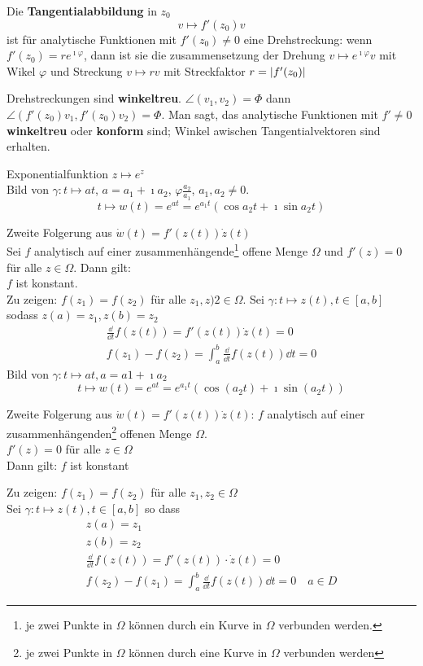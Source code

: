 Die \textbf{Tangentialabbildung} in $z_0$
\[ v \mapsto f'(z_0) v \]
ist für analytische Funktionen mit $f'(z_0) \neq 0$ eine Drehstreckung: wenn $f'(z_0) = re^{\imath\varphi}$, dann ist sie die zusammensetzung der Drehung $v \mapsto e^{\imath\varphi}v$ mit Wikel $\varphi$ und Streckung $v \mapsto rv$ mit Streckfaktor $r = \abs{f'(z_0)}$

Drehstreckungen sind \textbf{winkeltreu}.
$\angle (v_1 , v_2) = \Phi$ dann $\angle( f'(z_0) v_1 , f'(z_0)v_2 ) = \Phi$.
Man sagt, das analytische Funktionen mit $f' \neq 0$ \textbf{winkeltreu} oder \textbf{konform} sind; Winkel awischen Tangentialvektoren sind erhalten.

\begin{bsp*}
	Exponentialfunktion $z \mapsto e^z$ \\
	Bild von $\gamma : t \mapsto at$, $a = a_1 + \imath a_2$, $\varphi \frac{a_2}{a_1}$, $a_1 , a_2 \neq 0$.
	\[ t \mapsto w(t) = e^{at} = e^{a_1 t} ( \cos a_2 t + \imath \sin a_2 t ) \]
\end{bsp*}

Zweite Folgerung aus $\dot{w}(t) = f'(z(t))\dot{z}(t)$ \\
Sei $f$ analytisch auf einer zusammenhängende\footnote{je zwei Punkte in $\Omega$ können durch ein Kurve in $\Omega$ verbunden werden.} offene Menge $\Omega$ und $f'(z) = 0$ für alle $z \in \Omega$. Dann gilt: \\
$f$ ist konstant. \\
Zu zeigen: $f(z_1) = f(z_2)$ für alle $z_1 , z)2 \in \Omega$. Sei $\gamma : t \mapsto z(t) , t \in [a,b]$ sodass $z(a) = z_1 , z(b) = z_2$ \\
\begin{gather*}
	\frac{\dd}{\dd t} f(z(t)) = f'(z(t)) \dot{z}(t) = 0 \\
	f(z_1) - f(z_2) = \int_a^b \frac{\dd}{\dd t} f(z(t)) \dd t = 0
\end{gather*}
Bild von $\gamma : t \mapsto at , a = a1 + \imath a_2$
\[ t \mapsto w(t) = e^{at} = e^{a_1 t} (\cos(a_2 t) + \imath \sin(a_2 t)) \]
\begin{folge}
	Zweite Folgerung aus $\dot{w}(t) = f'(z(t)) \dot{z}(t)$:
	$f$ analytisch auf einer zusammenhängenden\footnote{je zwei Punkte in $\Omega$ können durch eine Kurve in $\Omega$ verbunden werden} offenen Menge $\Omega$. \\
	$f'(z) = 0$ für alle $z \in \Omega$ \\
	Dann gilt: $f$ ist konstant \\
	\begin{bew}
		Zu zeigen: $f(z_1) = f(z_2)$ für alle $z_1 , z_2 \in \Omega$ \\
		Sei $\gamma : t \mapsto z(t) , t \in [a,b]$ so dass
		\begin{gather*}
			z(a) = z_1 \\
			z(b) = z_2 \\
			\frac{\dd}{\dd t} f(z(t)) = f'(z(t)) \cdot \dot{z}(t) = 0 \\
			f(z_2) - f(z_1) = \int_a^b \frac{\dd}{\dd t} f(z(t)) \dd t = 0 \quad a \in D
		\end{gather*}
	\end{bew}
\end{folge}

